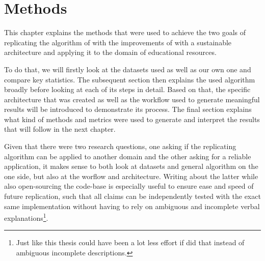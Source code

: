 \chapter{Methods}


This chapter explains the methods that were used to achieve the two goals of replicating the algorithm of \textcite{Derrac2015} with the improvements of \cite{Ager2018,Alshaikh2020} with a sustainable architecture and applying it to the domain of educational resources.  

To do that, we will firstly look at the datasets \mainalgos used as well as our own one and compare key statistics. The subsequent section then explains the used algorithm broadly before looking at each of its steps in detail. Based on that, the specific architecture that was created as well as the workflow used to generate meaningful results will be introduced to demonstrate its process. The final section explains what kind of methods and metrics were used to generate and interpret the results that will follow in the next chapter.

Given that there were two research questions, one asking if the replicating algorithm can be applied to another domain and the other asking for a reliable application, it makes sense to both look at datasets and general algorithm on the one side, but also at the worflow and architecture. Writing about the latter while also open-sourcing the code-base is especially useful to ensure ease and speed of future replication, such that all claims can be independently tested with the exact same implementation without having to rely on ambiguous and incomplete verbal explanations\footnote{Just like this thesis could have been a lot less effort if \mainalgos did that instead of ambiguous incomplete descriptions. }. 




